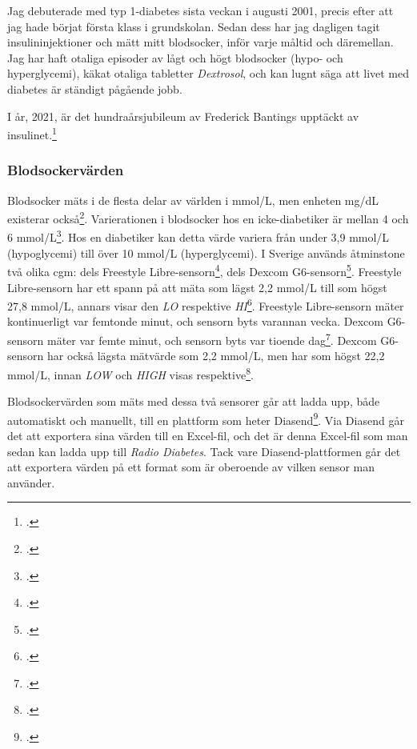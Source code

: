 \documentclass[11pt, a4paper]{article} %
\begin{document}
Jag debuterade med typ 1-diabetes sista veckan i augusti 2001, precis efter att jag hade börjat första klass i grundskolan. Sedan dess har jag dagligen tagit insulininjektioner och mätt mitt blodsocker, inför varje måltid och däremellan. Jag har haft otaliga episoder av lågt och högt blodsocker (hypo- och hyperglycemi), käkat otaliga tabletter \emph{Dextrosol}, och kan lugnt säga att livet med diabetes är ständigt pågående jobb. 

I år, 2021, är det hundraårsjubileum av Frederick Bantings upptäckt av insulinet.\footcite{noauthor_insulinet_nodate}

\subsubsection*{Blodsockervärden}
Blodsocker mäts i de flesta delar av världen i mmol/L, men enheten mg/dL existerar också\footcite{noauthor_blood_2021}. Varierationen i blodsocker hos en icke-diabetiker är mellan 4 och 6 mmol/L\footcite{noauthor_blood_2021}. Hos en diabetiker kan detta värde variera från under 3,9 mmol/L (hypoglycemi) till över 10 mmol/L (hyperglycemi). I Sverige används åtminstone två olika \gls{cgm}: dels Freestyle Libre-sensorn\footcite{noauthor_freestyle_nodate}, dels Dexcom G6-sensorn\footcite{noauthor_dexcom_nodate}. Freestyle Libre-sensorn har ett spann på att mäta som lägst 2,2 mmol/L till som högst 27,8 mmol/L, annars visar den \emph{LO} respektive \emph{HI}\footcite{noauthor_forsta_nodate}. Freestyle Libre-sensorn mäter kontinuerligt var femtonde minut, och sensorn byts varannan vecka. Dexcom G6-sensorn mäter var femte minut, och sensorn byts var tioende dag\footcite{noauthor_vad_2018}. Dexcom G6-sensorn har också lägsta mätvärde som 2,2 mmol/L, men har som högst 22,2 mmol/L, innan \emph{LOW} och \emph{HIGH} visas respektive\footcite{noauthor_dexcom_nodate}.

Blodsockervärden som mäts med dessa två sensorer går att ladda upp, både automatiskt och manuellt, till en plattform som heter Diasend\footcite{noauthor_diasend_nodate}. Via Diasend går det att exportera sina värden till en Excel-fil, och det är denna Excel-fil som man sedan kan ladda upp till \emph{Radio Diabetes}. Tack vare Diasend-plattformen går det att exportera värden på ett format som är oberoende av vilken sensor man använder.
\end{document}
